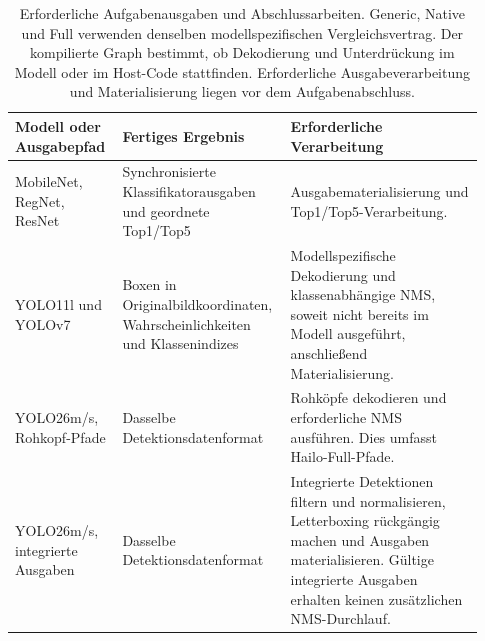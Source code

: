 \begin{table}[t]
\centering\small
\caption{Erforderliche Aufgabenausgaben und Abschlussarbeiten. Generic, Native und Full verwenden denselben modellspezifischen Vergleichsvertrag. Der kompilierte Graph bestimmt, ob Dekodierung und Unterdrückung im Modell oder im Host-Code stattfinden. Erforderliche Ausgabeverarbeitung und Materialisierung liegen vor dem Aufgabenabschluss.}
\label{tab:supp-endpoint-contracts}
\setlength{\tabcolsep}{3pt}
\begin{tabular}{@{}>{\raggedright\arraybackslash}p{0.22\linewidth}>{\raggedright\arraybackslash}p{0.31\linewidth}>{\raggedright\arraybackslash}p{0.4\linewidth}@{}}
\toprule
Modell oder Ausgabepfad & Fertiges Ergebnis & Erforderliche Verarbeitung \\
\midrule
MobileNet, RegNet, ResNet & Synchronisierte Klassifikatorausgaben und geordnete Top1/Top5 & Ausgabematerialisierung und Top1/Top5-Verarbeitung. \\
YOLO11l und YOLOv7 & Boxen in Originalbildkoordinaten, Wahrscheinlichkeiten und Klassenindizes & Modellspezifische Dekodierung und klassenabhängige NMS, soweit nicht bereits im Modell ausgeführt, anschließend Materialisierung. \\
YOLO26m/s, Rohkopf-Pfade & Dasselbe Detektionsdatenformat & Rohköpfe dekodieren und erforderliche NMS ausführen. Dies umfasst Hailo-Full-Pfade. \\
YOLO26m/s, integrierte Ausgaben & Dasselbe Detektionsdatenformat & Integrierte Detektionen filtern und normalisieren, Letterboxing rückgängig machen und Ausgaben materialisieren. Gültige integrierte Ausgaben erhalten keinen zusätzlichen NMS-Durchlauf. \\
\bottomrule
\end{tabular}
\end{table}
